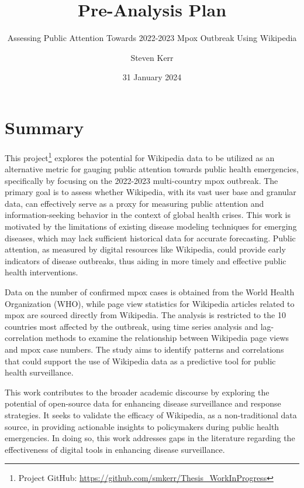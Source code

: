 \documentclass[
  letterpaper,
  DIV=11,
  numbers=noendperiod]{scrartcl}
\title{Pre-Analysis Plan}
\subtitle{Assessing Public Attention Towards 2022-2023 Mpox Outbreak
Using Wikipedia}
\author{Steven Kerr}
\date{31 January 2024}
\begin{document}
\maketitle
\ifdefined\Shaded\renewenvironment{Shaded}{\begin{tcolorbox}[boxrule=0pt, sharp corners, interior hidden, borderline west={3pt}{0pt}{shadecolor}, breakable, enhanced, frame hidden]}{\end{tcolorbox}}\fi

\hypertarget{summary}{%
\section{Summary}\label{summary}}

This project\footnote{Project GitHub:
  \url{https://github.com/smkerr/Thesis_WorkInProgress}} explores the
potential for Wikipedia data to be utilized as an alternative metric for
gauging public attention towards public health emergencies, specifically
by focusing on the 2022-2023 multi-country mpox outbreak. The primary
goal is to assess whether Wikipedia, with its vast user base and
granular data, can effectively serve as a proxy for measuring public
attention and information-seeking behavior in the context of global
health crises. This work is motivated by the limitations of existing
disease modeling techniques for emerging diseases, which may lack
sufficient historical data for accurate forecasting. Public attention,
as measured by digital resources like Wikipedia, could provide early
indicators of disease outbreaks, thus aiding in more timely and
effective public health interventions.

Data on the number of confirmed mpox cases is obtained from the World
Health Organization (WHO), while page view statistics for Wikipedia
articles related to mpox are sourced directly from Wikipedia. The
analysis is restricted to the 10 countries most affected by the
outbreak, using time series analysis and lag-correlation methods to
examine the relationship between Wikipedia page views and mpox case
numbers. The study aims to identify patterns and correlations that could
support the use of Wikipedia data as a predictive tool for public health
surveillance.

This work contributes to the broader academic discourse by exploring the
potential of open-source data for enhancing disease surveillance and
response strategies. It seeks to validate the efficacy of Wikipedia, as
a non-traditional data source, in providing actionable insights to
policymakers during public health emergencies. In doing so, this work
addresses gaps in the literature regarding the effectiveness of digital
tools in enhancing disease surveillance.
\end{document}

